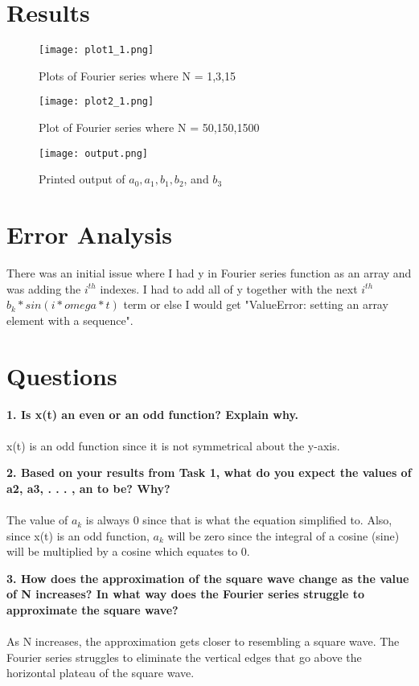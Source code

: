 \documentclass[12pt]{report}
\begin{document}
\section{Results}

\begin{figure}[htp]
    \centering
    \texttt{[image: plot1\_1.png]}
    \caption{Plots of Fourier series where N = {1,3,15}}
\end{figure}

\begin{figure}[htp]
    \centering
    \texttt{[image: plot2\_1.png]}
    \caption{Plot of Fourier series where N = {50,150,1500}}
\end{figure}

\begin{figure}[htp]
    \centering
    \texttt{[image: output.png]}
    \caption{Printed output of \(a_0, a_1, b_1, b_2\), and \(b_3\)}
\end{figure}

\pagebreak
\section{Error Analysis}
There was an initial issue where I had y in Fourier series function as an array and was adding the $i^{th}$ indexes. I had to add all of y together with the next $i^{th}$ \(b_k * sin(i*omega*t)\) term or else I would get "ValueError: setting an array element with a sequence".
\section{Questions}
\textbf{1. Is x(t) an even or an odd function? Explain why.} \\ \\
x(t) is an odd function since it is not symmetrical about the y-axis.

\textbf{2. Based on your results from Task 1, what do you expect the values of a2, a3, . . . , an to be?
Why?} \\ \\
The value of \(a_k\) is always 0 since that is what the equation simplified to. Also, since x(t) is an odd function, \(a_k\) will be zero since the integral of a cosine (sine) will be multiplied by a cosine which equates to 0.

\textbf{3. How does the approximation of the square wave change as the value of N increases? In what
way does the Fourier series struggle to approximate the square wave?} \\ \\
As N increases, the approximation gets closer to resembling a square wave. The Fourier series struggles to eliminate the vertical edges that go above the horizontal plateau of the square wave.
\end{document}
